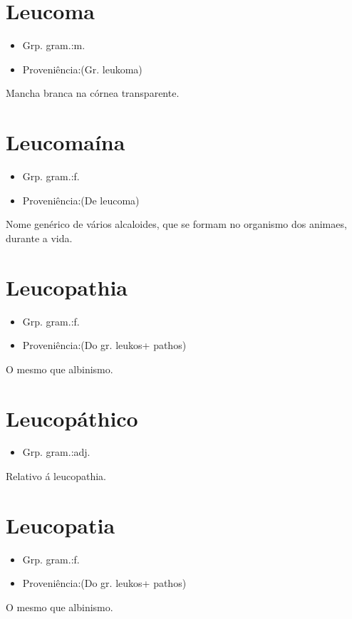 \section{Leucoma}
\begin{itemize}
\item {Grp. gram.:m.}
\end{itemize}
\begin{itemize}
\item {Proveniência:(Gr. \textunderscore leukoma\textunderscore )}
\end{itemize}
Mancha branca na córnea transparente.
\section{Leucomaína}
\begin{itemize}
\item {Grp. gram.:f.}
\end{itemize}
\begin{itemize}
\item {Proveniência:(De \textunderscore leucoma\textunderscore )}
\end{itemize}
Nome genérico de vários alcaloides, que se formam no organismo dos animaes, durante a vida.
\section{Leucopathia}
\begin{itemize}
\item {Grp. gram.:f.}
\end{itemize}
\begin{itemize}
\item {Proveniência:(Do gr. \textunderscore leukos\textunderscore  + \textunderscore pathos\textunderscore )}
\end{itemize}
O mesmo que \textunderscore albinismo\textunderscore .
\section{Leucopáthico}
\begin{itemize}
\item {Grp. gram.:adj.}
\end{itemize}
Relativo á leucopathia.
\section{Leucopatia}
\begin{itemize}
\item {Grp. gram.:f.}
\end{itemize}
\begin{itemize}
\item {Proveniência:(Do gr. \textunderscore leukos\textunderscore  + \textunderscore pathos\textunderscore )}
\end{itemize}
O mesmo que \textunderscore albinismo\textunderscore .
